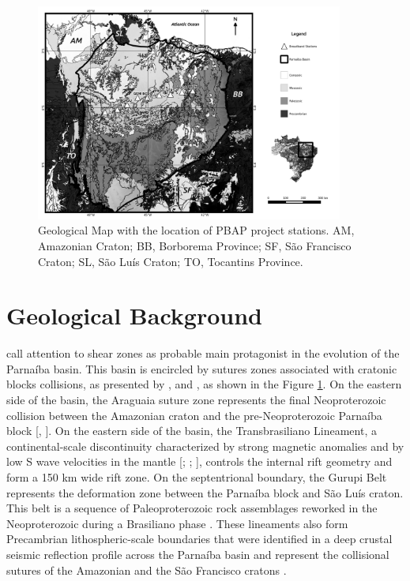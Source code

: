\documentclass[paper,11pt]{geophysics}
\begin{document}
\begin{figure}[!ht]
\centering
\includegraphics[width=0.9\textwidth]{Fig/Mapa_geologico_BP_grey.jpg}
\caption{Geological Map with the location of PBAP project stations. AM, Amazonian Craton; BB, Borborema Province; SF, São Francisco Craton; SL, São Luís Craton; TO, Tocantins Province.}
\label{mapa_estacoes_geologico}
\end{figure}

\section{Geological Background}

\cite{de_castro_geophysical_2016} call attention to shear zones as probable main protagonist in the evolution of the Parnaíba basin. This basin is encircled by sutures zones associated with cratonic blocks collisions, as presented by \cite{daly_brasiliano_2014}, \cite{de_castro_crustal_2014} and \cite{de_castro_geophysical_2016}, as shown in the Figure \ref{mapa_estacoes_geologico}. On the eastern side of the basin, the Araguaia suture zone represents the final Neoproterozoic collision between the Amazonian craton and the pre-Neoproterozoic Parnaíba block [\cite{fuck_rodinia_2008}, \cite{brito_neves_basement_2014}]. On the eastern side of the basin, the Transbrasiliano Lineament, a continental-scale discontinuity characterized by strong magnetic anomalies and by low S wave velocities in the mantle [\cite{fairhead_champ_2003}; \cite{feng_group_velocity_2004};  \cite{brito_neves_basement_2014}], controls the internal rift geometry and form a 150 km wide rift zone. On the septentrional boundary, the Gurupi Belt represents the deformation zone between the Parnaíba block and São Luís craton. This belt is a sequence of Paleoproterozoic rock assemblages reworked in the Neoproterozoic during a Brasiliano phase \citep{klein_gurupi_2005}. These lineaments also form Precambrian lithospheric-scale boundaries that were identified in a deep crustal seismic reflection profile across the Parnaíba basin \cite{daly_brasiliano_2014} and represent the collisional sutures of the Amazonian and the São Francisco cratons \cite{de_castro_crustal_2014}.
\end{document}
